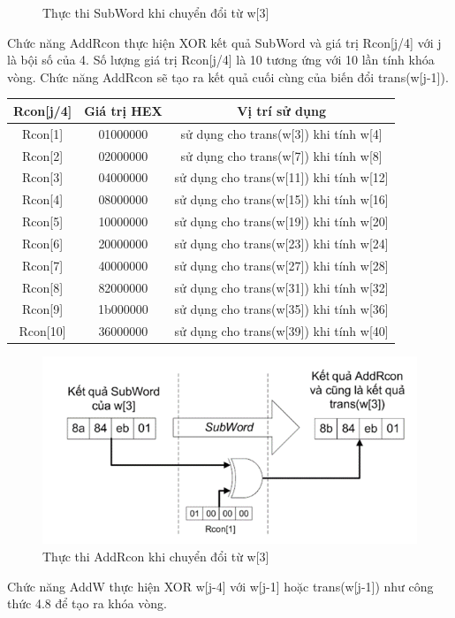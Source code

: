 \begin{itemize}
\begin{figure}[H]
        \caption{Thực thi SubWord khi chuyển đổi từ w[3]}
    \end{figure}
    Chức năng AddRcon thực hiện XOR kết quả SubWord và giá trị Rcon[j/4] với j là bội số của 4. Số lượng giá trị Rcon[j/4] là 10 tương ứng với 10 lần tính khóa vòng. Chức năng AddRcon sẽ tạo ra kết quả cuối cùng của biến đổi trans(w[j-1]).
    \begin{tabular}{|c|c|c|}
    
\hline
\textbf{Rcon[j/4]} & \textbf{Giá trị HEX} & \textbf{Vị trí sử dụng} \\
\hline
Rcon[1] & 01000000 & sử dụng cho trans(w[3]) khi tính w[4] \\
Rcon[2] & 02000000 & sử dụng cho trans(w[7]) khi tính w[8] \\
Rcon[3] & 04000000 & sử dụng cho trans(w[11]) khi tính w[12] \\
Rcon[4] & 08000000 & sử dụng cho trans(w[15]) khi tính w[16] \\
Rcon[5] & 10000000 & sử dụng cho trans(w[19]) khi tính w[20] \\
Rcon[6] & 20000000 & sử dụng cho trans(w[23]) khi tính w[24] \\
Rcon[7] & 40000000 & sử dụng cho trans(w[27]) khi tính w[28] \\
Rcon[8] & 82000000 & sử dụng cho trans(w[31]) khi tính w[32] \\
Rcon[9] & 1b000000 & sử dụng cho trans(w[35]) khi tính w[36] \\
Rcon[10] & 36000000 & sử dụng cho trans(w[39]) khi tính w[40] \\
\hline
\end{tabular}
\begin{figure}[H]
    \centering
    \includegraphics{Ảnh/hiền/addcon.png}
    \caption{Thực thi AddRcon khi chuyển đổi từ w[3]}
\end{figure}
Chức năng AddW thực hiện XOR w[j-4] với w[j-1] hoặc trans(w[j-1]) như công thức 4.8 để tạo ra khóa vòng.

\end{itemize}
